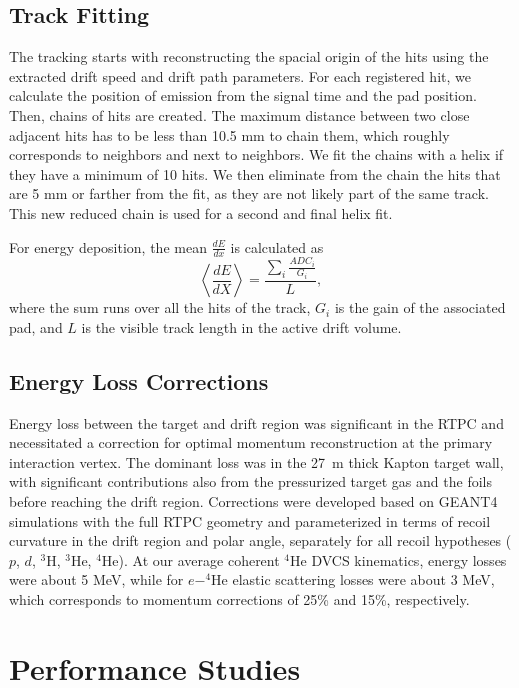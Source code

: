 \documentclass[preprint,5p]{elsarticle}
\begin{document}
\subsection{Track Fitting}\label{sec_rec}

The tracking starts with reconstructing the spacial origin of the hits using 
the extracted drift speed and drift path parameters. For each registered hit, 
we calculate the position of emission from the signal time and the pad 
position. Then, chains of hits are created. The maximum distance between two 
close adjacent hits has to be less than 10.5 mm to chain them, which roughly 
corresponds to neighbors and next to neighbors. We fit the chains with a helix 
if they have a minimum of 10 hits. We then eliminate from the chain the hits 
that are 5 mm or farther from the fit, as they are not likely part of the same 
track. This new reduced chain is used for a second and final helix fit.

For energy deposition, the mean $\frac{dE}{dx}$ is calculated as
\begin{equation}
 \left\langle \frac{dE}{dX} \right\rangle= \frac{\sum\limits_{i} \frac{ADC_{i}}{G_i}}{L},
\end{equation}
where the sum runs over all the hits of the track, $G_{i}$ is the gain of 
the associated pad, and $L$ is the visible track length in the active drift 
volume. 

\subsection{Energy Loss Corrections}\label{sec_eloss}
Energy loss between the target and drift region was significant in the RTPC and 
necessitated a correction for optimal momentum reconstruction at the primary 
interaction vertex.  The dominant loss was in the 27~\textmu{}m thick Kapton target 
wall, with significant contributions also from the pressurized target gas and 
the foils before reaching the drift region.  Corrections were developed based 
on GEANT4 simulations with the full RTPC geometry and parameterized in terms of 
recoil curvature in the drift region and polar angle, separately for all recoil 
hypotheses ($p$, $d$, $^3$H, $^3$He, $^4$He).  At our average coherent $^4$He 
DVCS kinematics, energy losses were about 5 MeV, while for $e-^4$He elastic 
scattering losses were about 3 MeV, which corresponds to momentum corrections 
of 25\% and 15\%, respectively.

\section{Performance Studies}\label{sec_perfor}
\end{document}
